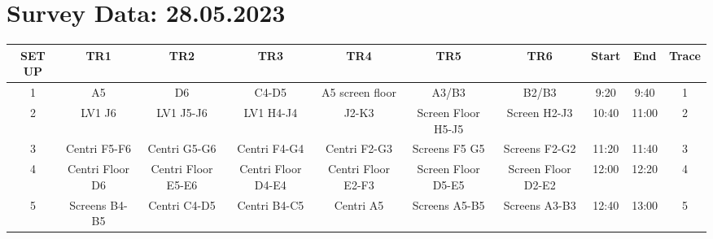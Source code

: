 \documentclass[8pt]{article}
\begin{document}
\section*{Survey Data: 28.05.2023}
\begin{tabular}{|c|c|c|c|c|c|c|c|c|c|}
\hline
SET UP & TR1 & TR2 & TR3 & TR4 & TR5 & TR6 & Start & End & Trace\\
\hline
1 & A5 & D6 & C4-D5 & A5 screen floor & A3/B3 & B2/B3 & 9:20 & 9:40 & 1\\
2 & LV1 J6 & LV1 J5-J6 & LV1 H4-J4 & J2-K3 & Screen Floor H5-J5 & Screen H2-J3 & 10:40 & 11:00 & 2\\
3 & Centri F5-F6 & Centri G5-G6 & Centri F4-G4 & Centri F2-G3 & Screens F5 G5 & Screens F2-G2 & 11:20 & 11:40 & 3\\
4 & Centri Floor D6 & Centri Floor E5-E6 & Centri Floor D4-E4 & Centri Floor E2-F3 & Screen Floor D5-E5 & Screen Floor D2-E2 & 12:00 & 12:20 & 4\\
5 & Screens B4-B5 & Centri C4-D5 & Centri B4-C5 & Centri A5 & Screens A5-B5 & Screens A3-B3 & 12:40 & 13:00 & 5\\
\hline
\end{tabular}
\end{document}
